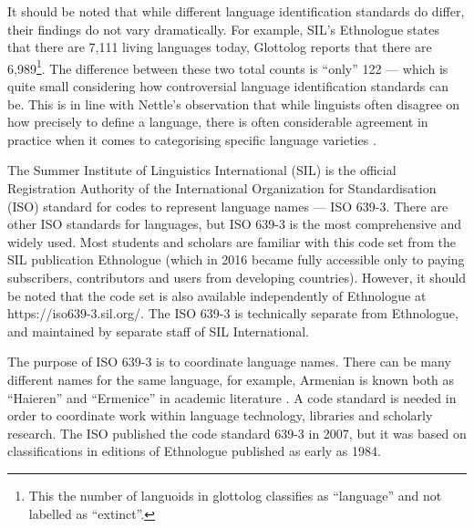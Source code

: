 \documentclass[12pt,letterpaper]{article}
\begin{document}
It should be noted that while different language identification standards do differ, their findings do not vary dramatically. For example, SIL's Ethnologue states that there are 7,111 living languages today, Glottolog reports that there are 6,989\footnote{This the number of languoids in glottolog classifies as ``language'' and not labelled as ``extinct''.}. The difference between these two total counts is ``only'' 122 --- which is quite small considering how controversial language identification standards can be. This is in line with Nettle's observation that while linguists often disagree on how precisely to define a language, there is often considerable agreement in practice when it comes to categorising specific language varieties \citep[356]{NETTLE1998}.

The Summer Institute of Linguistics International (SIL) is the official Registration Authority of the International Organization for Standardisation (ISO) standard for codes to represent language names --- ISO 639-3. There are other ISO standards for languages, but ISO 639-3 is the most comprehensive and widely used. Most students and scholars are familiar with this code set from the SIL publication Ethnologue (which in 2016 became fully accessible only to paying subscribers, contributors and users from developing countries). However, it should be noted that the code set is also available independently of Ethnologue at https://iso639-3.sil.org/. The ISO 639-3 is technically separate from Ethnologue, and maintained by separate staff of SIL International.

The purpose of ISO 639-3 is to coordinate language names. There can be many different names for the same language, for example, Armenian is known both as ``Haieren'' and ``Ermenice'' in academic literature \citep{multitree2014}. A code standard is needed in order to coordinate work within language technology, libraries and scholarly research. The ISO published the code standard 639-3 in 2007, but it was based on classifications in editions of Ethnologue published as early as 1984. %
\end{document}
